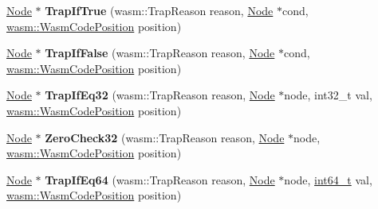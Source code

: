 \begin{DoxyCompactItemize}
\item 
\mbox{\label{classv8_1_1internal_1_1compiler_1_1WasmGraphBuilder_afa16ff9c7525cdbb52c1f00e384371b4}} 
\mbox{\hyperlink{classv8_1_1internal_1_1compiler_1_1Node}{Node}} $\ast$ {\bfseries Trap\+If\+True} (wasm\+::\+Trap\+Reason reason, \mbox{\hyperlink{classv8_1_1internal_1_1compiler_1_1Node}{Node}} $\ast$cond, \mbox{\hyperlink{classint}{wasm\+::\+Wasm\+Code\+Position}} position)
\item 
\mbox{\label{classv8_1_1internal_1_1compiler_1_1WasmGraphBuilder_a1c8b28ae6d5327fb87e4f4e382c20d23}} 
\mbox{\hyperlink{classv8_1_1internal_1_1compiler_1_1Node}{Node}} $\ast$ {\bfseries Trap\+If\+False} (wasm\+::\+Trap\+Reason reason, \mbox{\hyperlink{classv8_1_1internal_1_1compiler_1_1Node}{Node}} $\ast$cond, \mbox{\hyperlink{classint}{wasm\+::\+Wasm\+Code\+Position}} position)
\item 
\mbox{\label{classv8_1_1internal_1_1compiler_1_1WasmGraphBuilder_a099c35618db02442a25f15e543868b76}} 
\mbox{\hyperlink{classv8_1_1internal_1_1compiler_1_1Node}{Node}} $\ast$ {\bfseries Trap\+If\+Eq32} (wasm\+::\+Trap\+Reason reason, \mbox{\hyperlink{classv8_1_1internal_1_1compiler_1_1Node}{Node}} $\ast$node, int32\+\_\+t val, \mbox{\hyperlink{classint}{wasm\+::\+Wasm\+Code\+Position}} position)
\item 
\mbox{\label{classv8_1_1internal_1_1compiler_1_1WasmGraphBuilder_ac7a6b0bb5475923708cdb02cdb25476d}} 
\mbox{\hyperlink{classv8_1_1internal_1_1compiler_1_1Node}{Node}} $\ast$ {\bfseries Zero\+Check32} (wasm\+::\+Trap\+Reason reason, \mbox{\hyperlink{classv8_1_1internal_1_1compiler_1_1Node}{Node}} $\ast$node, \mbox{\hyperlink{classint}{wasm\+::\+Wasm\+Code\+Position}} position)
\item 
\mbox{\label{classv8_1_1internal_1_1compiler_1_1WasmGraphBuilder_a3f4aa0b37a7dfc44beab009a37397988}} 
\mbox{\hyperlink{classv8_1_1internal_1_1compiler_1_1Node}{Node}} $\ast$ {\bfseries Trap\+If\+Eq64} (wasm\+::\+Trap\+Reason reason, \mbox{\hyperlink{classv8_1_1internal_1_1compiler_1_1Node}{Node}} $\ast$node, \mbox{\hyperlink{classint64__t}{int64\+\_\+t}} val, \mbox{\hyperlink{classint}{wasm\+::\+Wasm\+Code\+Position}} position)

\end{DoxyCompactItemize}
